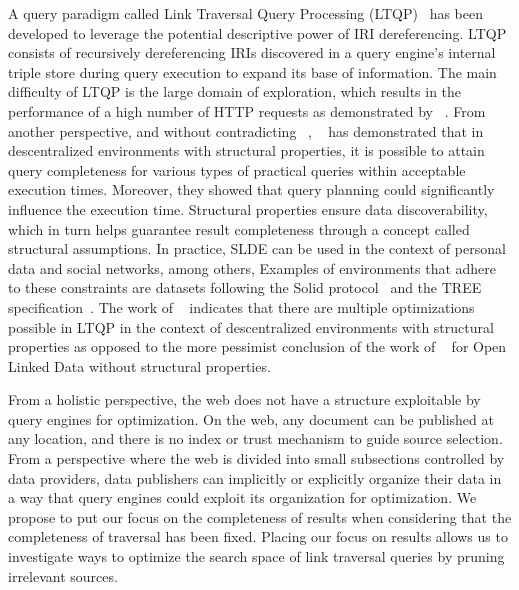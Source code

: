 A query paradigm called Link Traversal Query Processing (LTQP)~\cite{Hartig2012} has been developed to leverage the potential descriptive power of IRI dereferencing.
LTQP consists of recursively dereferencing IRIs discovered in a query engine's internal triple store during query execution to expand its base of information.
The main difficulty of LTQP is the large domain of exploration, which results in the performance of a high number of HTTP requests as demonstrated by \citeauthor{hartig2016walking}~\cite{hartig2016walking}.
From another perspective, and without contradicting \citeauthor{hartig2016walking}~\cite{hartig2016walking}, \citeauthor{Taelman2023}~\cite{Taelman2023} has demonstrated that in descentralized environments with structural properties,
it is possible to attain query completeness for various types of practical queries within acceptable execution times.
Moreover, they showed that query planning could significantly influence the execution time.
Structural properties ensure data discoverability, which in turn helps guarantee result completeness through a concept called structural assumptions.
In practice, SLDE can be used in the context of personal data and social networks, among others,
Examples of environments that adhere to these constraints are datasets following the Solid protocol~\cite{Taelman2023} and the TREE specification~\cite{tam_iswc_traversalsensortree_2024}.
The work of \citeauthor{Taelman2023}~\cite{Taelman2023} indicates that there are multiple optimizations possible in LTQP in the context of descentralized environments with structural properties as opposed to the
more pessimist conclusion of the work of \citeauthor{hartig2016walking}~\cite{hartig2016walking} for Open Linked Data without structural properties.

From a holistic perspective, the web does not have a structure exploitable by query engines for optimization.
On the web, any document can be published at any location, and there is no index or trust mechanism to guide source selection.
From a perspective where the web is divided into small subsections controlled by data providers, data publishers can implicitly or explicitly organize their data  
in a way that query engines could exploit its organization for optimization.
We propose to put our focus on the completeness of results when considering that the completeness of traversal has been fixed.
Placing our focus on results allows us to investigate ways to optimize the search space of link traversal queries by pruning irrelevant sources.

